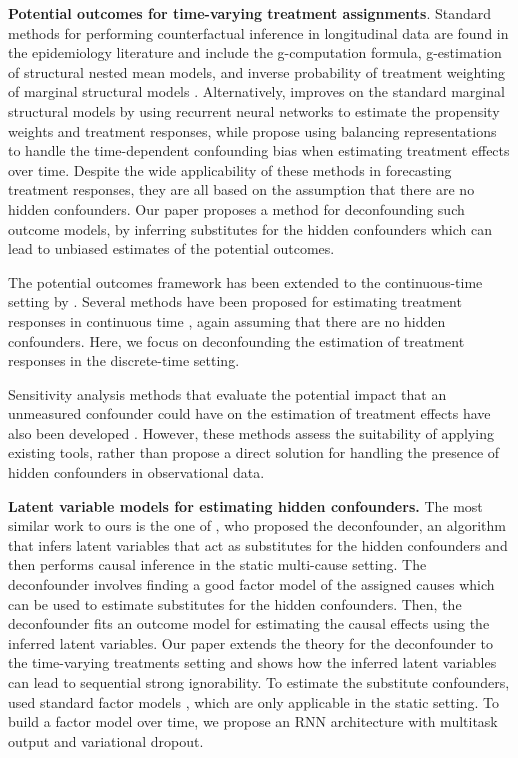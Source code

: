 \documentclass{article}
\begin{document}
	\textbf{Potential outcomes for time-varying treatment assignments}.  
	Standard methods for performing counterfactual inference in longitudinal data are found in the epidemiology literature and include the g-computation formula, g-estimation of structural nested mean models, and inverse probability of treatment weighting of marginal structural models \citep{robins1994correcting, robins2000marginal, robins2008estimation}. Alternatively, \cite{lim2018forecasting} improves on the standard marginal structural models by using recurrent neural networks to estimate the propensity weights and treatment responses, while \cite{bica2020estimating} propose using balancing representations to handle the time-dependent confounding bias when estimating treatment effects over time. 
    Despite the wide applicability of these methods in forecasting treatment responses, they are all based on the assumption that there are no hidden confounders.  Our paper proposes a method for deconfounding such outcome models, by inferring substitutes for the hidden confounders which can lead to unbiased estimates of the potential outcomes.
	
    The potential outcomes framework has been extended to the continuous-time setting by \cite{lok2008statistical}. Several methods have been proposed for estimating treatment responses in continuous time \citep{soleimani2017treatment, schulam2017reliable}, again assuming that there are no hidden confounders. Here, we focus on deconfounding the estimation of treatment responses in the discrete-time setting.
	
    Sensitivity analysis methods that evaluate the potential impact that an unmeasured confounder could have on the estimation of treatment effects have also been developed \cite{robins2000sensitivity, roy2016bayesian, scharfstein2018global}. However, these methods assess the suitability of applying existing tools, rather than propose a direct solution for handling the presence of hidden confounders in observational data. 
	
    \textbf{Latent variable models for estimating hidden confounders.} The most similar work to ours is the one of \citet{wang2018blessings}, who proposed the deconfounder, an algorithm that infers latent variables that act as substitutes for the hidden confounders and then performs causal inference in the static multi-cause setting. The deconfounder involves finding a good factor model of the assigned causes which can be used to estimate substitutes for the hidden confounders. Then, the deconfounder fits an outcome model for estimating the causal effects using the inferred latent variables. Our paper extends the theory for the deconfounder to the time-varying treatments setting and shows how the inferred latent variables can lead to sequential strong ignorability.  To estimate the substitute confounders, \citet{wang2018blessings} used standard factor models  \citep{tipping1999probabilistic, ranganath2015deep}, which are only applicable in the static setting. To build a factor model over time, we propose an RNN architecture with multitask output and variational dropout.
	
\end{document}
